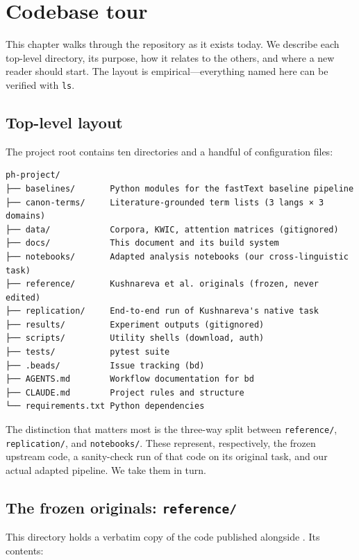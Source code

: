 \chapter{Codebase tour}
\label{ch:codebase}

This chapter walks through the repository as it exists today. We describe each top-level directory, its purpose, how it relates to the others, and where a new reader should start. The layout is empirical---everything named here can be verified with \texttt{ls}.

\section{Top-level layout}

The project root contains ten directories and a handful of configuration files:

\begin{verbatim}
ph-project/
├── baselines/       Python modules for the fastText baseline pipeline
├── canon-terms/     Literature-grounded term lists (3 langs × 3 domains)
├── data/            Corpora, KWIC, attention matrices (gitignored)
├── docs/            This document and its build system
├── notebooks/       Adapted analysis notebooks (our cross-linguistic task)
├── reference/       Kushnareva et al. originals (frozen, never edited)
├── replication/     End-to-end run of Kushnareva's native task
├── results/         Experiment outputs (gitignored)
├── scripts/         Utility shells (download, auth)
├── tests/           pytest suite
├── .beads/          Issue tracking (bd)
├── AGENTS.md        Workflow documentation for bd
├── CLAUDE.md        Project rules and structure
└── requirements.txt Python dependencies
\end{verbatim}

The distinction that matters most is the three-way split between \texttt{reference/}, \texttt{replication/}, and \texttt{notebooks/}. These represent, respectively, the frozen upstream code, a sanity-check run of that code on its original task, and our actual adapted pipeline. We take them in turn.

\section{The frozen originals: \texttt{reference/}}
\label{sec:reference}

This directory holds a verbatim copy of the code published alongside \textcite{kushnareva2021}. Its contents:

